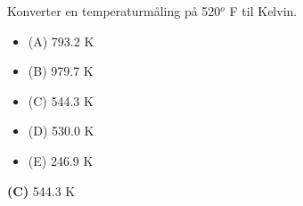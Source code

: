 

Konverter en temperaturmåling på 520$^{o}$ F til Kelvin.

\begin{itemize}
\item{(A)} 793.2 K
\vskip 5pt 
\item{(B)} 979.7 K
\vskip 5pt 
\item{(C)} 544.3 K
\vskip 5pt 
\item{(D)} 530.0 K
\vskip 5pt 
\item{(E)} 246.9 K
\end{itemize}







{\bf (C)} 544.3 K
 









